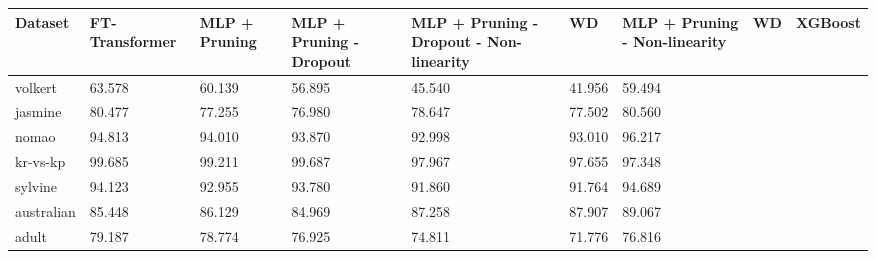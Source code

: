 \begin{tabular}{lllllll}
\toprule
Dataset & FT-Transformer & MLP + Pruning & MLP + Pruning - Dropout & MLP + Pruning - Dropout - Non-linearity & WD & MLP + Pruning - Non-linearity & WD & XGBoost \\
\midrule
volkert & 63.578 & 60.139 & 56.895 & 45.540 & 41.956 & 59.494 \\
jasmine & 80.477 & 77.255 & 76.980 & 78.647 & 77.502 & 80.560 \\
nomao & 94.813 & 94.010 & 93.870 & 92.998 & 93.010 & 96.217 \\
kr-vs-kp & 99.685 & 99.211 & 99.687 & 97.967 & 97.655 & 97.348 \\
sylvine & 94.123 & 92.955 & 93.780 & 91.860 & 91.764 & 94.689 \\
australian & 85.448 & 86.129 & 84.969 & 87.258 & 87.907 & 89.067 \\
adult & 79.187 & 78.774 & 76.925 & 74.811 & 71.776 & 76.816 \\
\bottomrule
\end{tabular}
